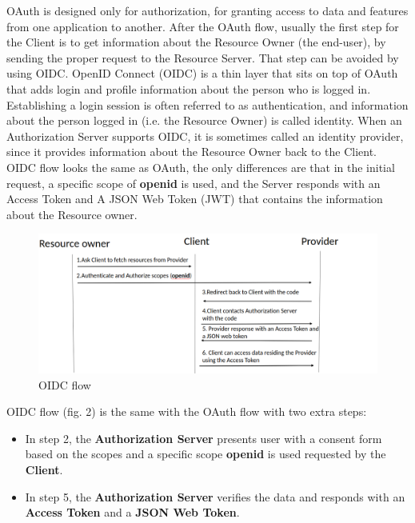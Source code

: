 OAuth is designed only for authorization, for granting access to data and features from one application to another. After the OAuth flow, usually the first step for the Client is to get information about the Resource Owner (the end-user), by sending the proper request to the Resource Server. That step can be avoided by using OIDC.
OpenID Connect (OIDC) is a thin layer that sits on top of OAuth that adds login and profile information about the person who is logged in. Establishing a login session is often referred to as authentication, and information about the person logged in (i.e. the Resource Owner) is called identity. When an Authorization Server supports OIDC, it is sometimes called an identity provider, since it provides information about the Resource Owner back to the Client. OIDC flow looks the same as OAuth, the only differences are that in the initial request, a specific scope of \textbf{openid} is used, and the Server responds with an Access Token and A JSON Web Token (JWT) that contains the information about the Resource owner.

\begin{figure}[htb]
	\centering
	\includegraphics[scale=0.4]{figures/OIDC.png}
	\caption{OIDC flow}
\end{figure}

OIDC flow (fig. 2) is the same with the OAuth flow with two extra steps:

\begin{itemize}
	
	\item In step 2, the \textbf{Authorization Server} presents user with a consent form based on the scopes and a specific scope \textbf{openid} is used requested by the \textbf{Client}.
	
	\item In step 5, the \textbf{Authorization Server} verifies the data and responds with an \textbf{Access Token} and a \textbf{JSON Web Token}.
\end{itemize}	

